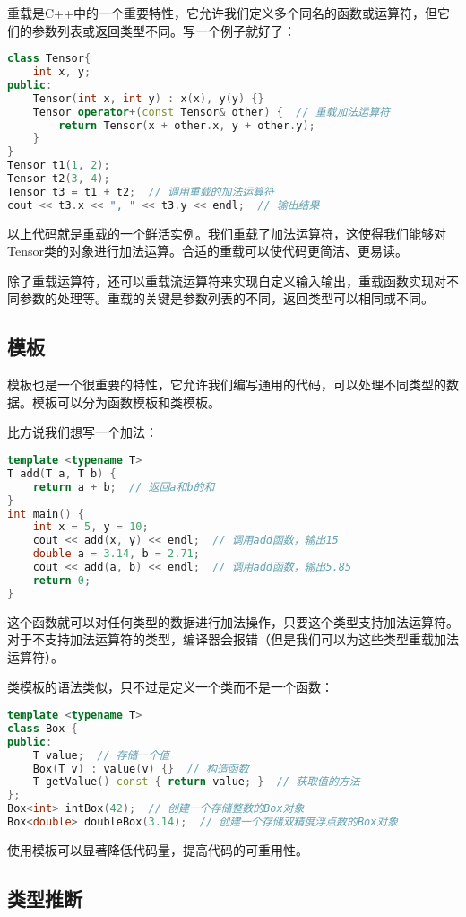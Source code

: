 重载是C++中的一个重要特性，它允许我们定义多个同名的函数或运算符，但它们的参数列表或返回类型不同。写一个例子就好了：

\begin{lstlisting}[language=C++]
class Tensor{
    int x, y;
public:
    Tensor(int x, int y) : x(x), y(y) {}
    Tensor operator+(const Tensor& other) {  // 重载加法运算符
        return Tensor(x + other.x, y + other.y);
    }
}
Tensor t1(1, 2);
Tensor t2(3, 4);
Tensor t3 = t1 + t2;  // 调用重载的加法运算符
cout << t3.x << ", " << t3.y << endl;  // 输出结果
\end{lstlisting}
以上代码就是重载的一个鲜活实例。我们重载了加法运算符，这使得我们能够对Tensor类的对象进行加法运算。合适的重载可以使代码更简洁、更易读。

除了重载运算符，还可以重载流运算符来实现自定义输入输出，重载函数实现对不同参数的处理等。重载的关键是参数列表的不同，返回类型可以相同或不同。

\subsection{模板}

模板也是一个很重要的特性，它允许我们编写通用的代码，可以处理不同类型的数据。模板可以分为函数模板和类模板。

比方说我们想写一个加法：
\begin{lstlisting}[language=C++]
template <typename T>
T add(T a, T b) {
    return a + b;  // 返回a和b的和
}
int main() {
    int x = 5, y = 10;
    cout << add(x, y) << endl;  // 调用add函数，输出15
    double a = 3.14, b = 2.71;
    cout << add(a, b) << endl;  // 调用add函数，输出5.85
    return 0;
}
\end{lstlisting}
这个函数就可以对任何类型的数据进行加法操作，只要这个类型支持加法运算符。对于不支持加法运算符的类型，编译器会报错（但是我们可以为这些类型重载加法运算符）。

类模板的语法类似，只不过是定义一个类而不是一个函数：
\begin{lstlisting}[language=C++]
template <typename T>
class Box {
public:
    T value;  // 存储一个值
    Box(T v) : value(v) {}  // 构造函数
    T getValue() const { return value; }  // 获取值的方法
};
Box<int> intBox(42);  // 创建一个存储整数的Box对象
Box<double> doubleBox(3.14);  // 创建一个存储双精度浮点数的Box对象
\end{lstlisting}
使用模板可以显著降低代码量，提高代码的可重用性。

\subsection{类型推断}

